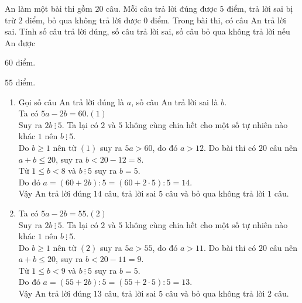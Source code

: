 \begin{vd}%
 An làm một bài thi gồm $20$ câu. Mỗi câu trả lời đúng được $5$ điểm, trả lời sai bị trừ $2$ điểm, bỏ qua không trả lời được $0$ điểm. Trong bài thi, có câu An trả lời sai. Tính số câu trả lời đúng, số câu trả lời sai, số câu bỏ qua không trả lời nếu An được
 \begin{enumEX}{2}
  \item $60$ điểm.
  \item $55$ điểm.
 \end{enumEX}
 \loigiai
  {
  \begin{enumerate}
   \item Gọi số câu An trả lời đúng là $a$, số câu An trả lời sai là $b$.\\
   Ta có $5a-2b=60$.\hfill$(1)$\\
   Suy ra $2b\ \vdots\ 5$. Ta lại có $2$ và $5$ không cùng chia hết cho một số tự nhiên nào khác $1$ nên $b\ \vdots\ 5$.\\
   Do $b \geq 1$ nên từ $(1)$ suy ra $5a>60$, do đó $a>12$. Do bài thi có $20$ câu nên $a+b \leq 20$, suy ra $b<20-12=8$.\\
   Từ $1 \leq b <8$ và $b\ \vdots\ 5$ suy ra $b=5$.\\
   Do đó $a=(60+2b):5= (60+2 \cdot 5):5=14$.\\
   Vậy An trả lời đúng $14$ câu, trả lời sai $5$ câu và bỏ qua không trả lời $1$ câu.
   \item Ta có $5a-2b=55$.\hfill$(2)$\\
   Suy ra $2b\ \vdots\ 5$. Ta lại có $2$ và $5$ không cùng chia hết cho một số tự nhiên nào khác $1$ nên $b\ \vdots\ 5$.\\
   Do $b \geq 1$ nên từ $(2)$ suy ra $5a>55$, do đó $a>11$. Do bài thi có $20$ câu nên $a+b \leq 20$, suy ra $b<20-11=9$.\\
   Từ $1 \leq b <9$ và $b\ \vdots\ 5$ suy ra $b=5$.\\
   Do đó $a=(55+2b):5= (55+2 \cdot 5):5=13$.\\
   Vậy An trả lời đúng $13$ câu, trả lời sai $5$ câu và bỏ qua không trả lời $2$ câu.
  \end{enumerate}
  }
\end{vd}



